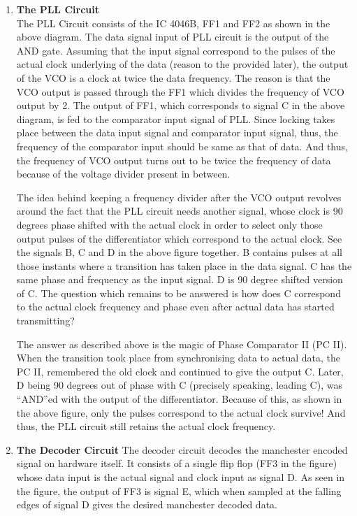 \documentclass{article}
\begin{document}
\begin{enumerate}[label=(\Alph*)]
\item \textbf{The PLL Circuit}\\
  The PLL Circuit consists of the IC 4046B, FF1 and FF2 as shown in the above diagram. The data signal input of PLL circuit is the output of the AND gate. Assuming that the input signal correspond to the pulses of the actual clock underlying of the data (reason to the provided later), the output of the VCO is a clock at twice the data frequency. The reason is that the VCO output is passed through the FF1 which divides the frequency of VCO output by 2. The output of FF1, which corresponds to signal C in the above diagram, is fed to the comparator input signal of PLL. Since locking takes place between the data input signal and comparator input signal, thus, the frequency of the comparator input should be same as that of data. And thus, the frequency of VCO output turns out to be twice the frequency of data because of the voltage divider present in between.

  The idea behind keeping a frequency divider after the VCO output revolves around the fact that the PLL circuit needs another signal, whose clock is 90 degrees phase shifted with the actual clock in order to select only those output pulses of the differentiator which correspond to the actual clock. See the signals B, C and D in the above figure together. B contains pulses at all those instants where a transition has taken place in the data signal. C has the same phase and frequency as the input signal. D is 90 degree shifted version of C. The question which remains to be answered is how does C correspond to the actual clock frequency and phase even after actual data has started transmitting?
  
The answer as described above is the magic of Phase Comparator II (PC II). When the transition took place from synchronising data to actual data, the PC II, remembered the old clock and continued to give the output C. Later, D being 90 degrees out of phase with C (precisely speaking, leading C), was “AND”ed with the output of the differentiator. Because of this, as shown in the above figure, only the pulses correspond to the actual clock survive! And thus, the PLL circuit still retains the actual clock frequency.    

\item \textbf{The Decoder Circuit}
  The decoder circuit decodes the manchester encoded signal on hardware itself. It consists of a single flip flop (FF3 in the figure) whose data input is the actual signal and clock input as signal D. As seen in the figure, the output of FF3 is signal E, which when sampled at the falling edges of signal D gives the desired manchester decoded data. 
  
\end{enumerate}
\end{document}

